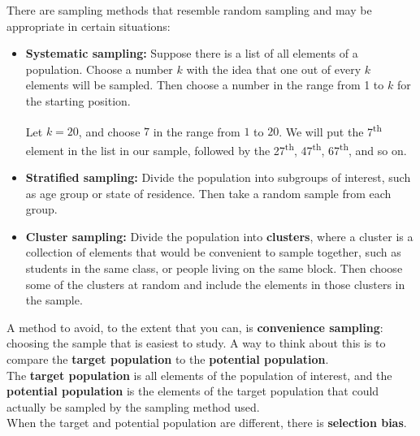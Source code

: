 \documentclass[12pt,openany]{book}
\begin{document}
	\noindent There are sampling methods that resemble random sampling and may be appropriate in certain situations:

	\begin{itemize}
		\item{
			\textbf{Systematic sampling:} Suppose there is a list of all elements of a population. Choose a number $k$ with the idea that one out of every $k$ elements will be sampled. Then choose a number in the range from 1 to $k$ for the starting position.

			\begin{tcolorbox}[width=0.95\textwidth,colback={green!10},title={\textbf{Example: Systematic Sampling}},colbacktitle={green!10},coltitle=black]
				Let $k=20$, and choose $7$ in the range from $1$ to $20$. We will put the 7\textsuperscript{th} element in the list in our sample, followed by the 27\textsuperscript{th}, 47\textsuperscript{th}, 67\textsuperscript{th}, and so on.
			\end{tcolorbox}
		}
		\item{
			\textbf{Stratified sampling:} Divide the population into subgroups of interest, such as age group or state of residence. Then take a random sample from each group.
		}
		\item{
			\textbf{Cluster sampling:} Divide the population into \textbf{clusters}, where a cluster is a collection of elements that would be convenient to sample together, such as students in the same class, or people living on the same block. Then choose some of the clusters at random and include the elements in those clusters in the sample.
		}
	\end{itemize}

	\begin{tcolorbox}[width=\textwidth,colback={yellow!10},title={\textbf{A Word of Caution: Convenience Sampling}},colbacktitle={yellow!10},coltitle=black]
		A method to avoid, to the extent that you can, is \textbf{convenience sampling}: choosing the sample that is easiest to study. A way to think about this is to compare the \textbf{target population} to the \textbf{potential population}.\\

		The \textbf{target population} is all elements of the population of interest, and the \textbf{potential population} is the elements of the target population that could actually be sampled by the sampling method used.\\

		When the target and potential population are different, there is \textbf{selection bias}.
	\end{tcolorbox}
\end{document}
